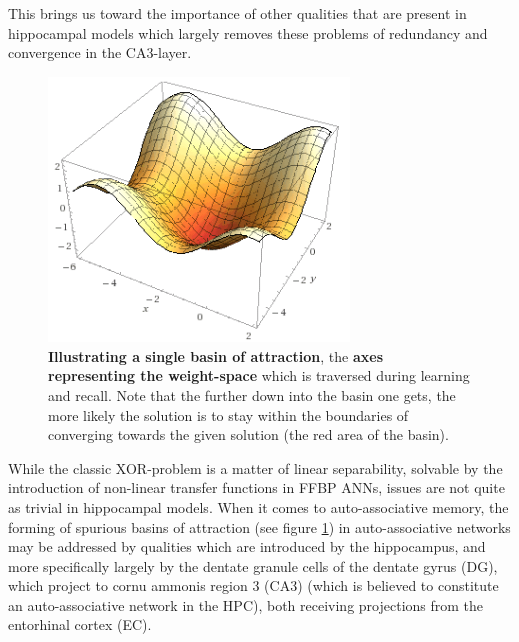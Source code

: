 This brings us toward the importance of other qualities that are present in hippocampal models which largely removes these problems of redundancy and convergence in the CA3-layer.

\begin{figure}
    \centering
    \includegraphics[width=8cm]{fig/simple-basin.png}
    \caption{\textbf{Illustrating a single basin of attraction}, the \textbf{axes representing the weight-space} which is traversed during learning and recall. Note that the further down into the basin one gets, the more likely the solution is to stay within the boundaries of converging towards the given solution (the red area of the basin).}
    \label{fig:simple-basin}
\end{figure}


While the classic XOR-problem is a matter of linear separability, solvable by the introduction of non-linear transfer functions in FFBP ANNs, issues are not quite as trivial in hippocampal models. When it comes to auto-associative memory, the forming of spurious basins of attraction (see figure \ref{fig:simple-basin}) in auto-associative networks may be addressed by qualities which are introduced by the hippocampus, and more specifically largely by the dentate granule cells of the dentate gyrus (DG), which project to cornu ammonis region 3 (CA3) (which is believed to constitute an auto-associative network in the HPC), both receiving projections from the entorhinal cortex (EC).

